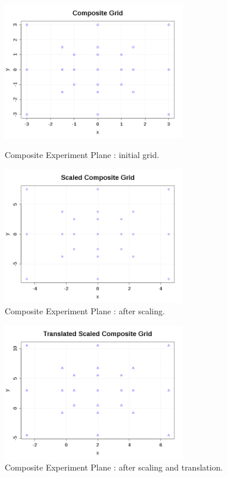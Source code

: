 \begin{figure}[H]
  \begin{minipage}{10cm}
    \begin{center}
      \includegraphics[width=8cm]{CompositeGrid.png}
      \caption{Composite Experiment Plane : initial grid.}
      \label{CompositeGrid}
    \end{center}
  \end{minipage}
  \hfill
  \begin{minipage}{10cm}
    \begin{center}
      \includegraphics[width=8cm]{ScaledCompositeGrid.png}
      \caption{Composite Experiment Plane : after scaling.}
      \label{ScaledCompositeGrid}
    \end{center}
  \end{minipage}
\end{figure}

\begin{figure}[H]
  \begin{center}
    \includegraphics[width=8cm]{TranslatedScaledCompositeGrid.png}
  \end{center}
  \caption{Composite Experiment Plane : after scaling and translation.}
  \label{TranslatedScaledCompositeGrid}
\end{figure}


